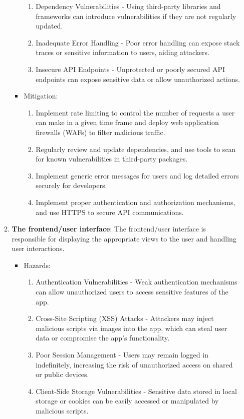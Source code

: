 \documentclass{article}
\begin{document}
\begin{enumerate}
\begin{enumerate}
\begin{itemize}
\begin{enumerate}
					\item Dependency Vulnerabilities - Using third-party libraries and frameworks can introduce vulnerabilities if they are not regularly updated.
					\item Inadequate Error Handling - Poor error handling can expose stack traces or sensitive information to users, aiding attackers.
					\item Insecure API Endpoints - Unprotected or poorly secured API endpoints can expose sensitive data or allow unauthorized actions.
				\end{enumerate}
			\item Mitigation:
				\begin{enumerate}
					\item Implement rate limiting to control the number of requests a user can make in a given time frame and deploy web application firewalls (WAFs) to filter malicious traffic. 
					\item Regularly review and update dependencies, and use tools to scan for known vulnerabilities in third-party packages.
					\item Implement generic error messages for users and log detailed errors securely for developers.
					\item Implement proper authentication and authorization mechanisms, and use HTTPS to secure API communications.
				\end{enumerate}
		\end{itemize}
        \item \textbf{The frontend/user interface}: The frontend/user interface
        is responsible for displaying the appropriate views to the user and
        handling user interactions.
		\begin{itemize}
			\item Hazards:
				\begin{enumerate}
					\item Authentication Vulnerabilities - Weak authentication mechanisms can allow unauthorized users to access sensitive features of the app.
					\item Cross-Site Scripting (XSS) Attacks - Attackers may inject malicious scripts via images into the app, which can steal user data or compromise the app's functionality.
					\item Poor Session Management - Users may remain logged in indefinitely, increasing the risk of unauthorized access on shared or public devices.
					\item Client-Side Storage Vulnerabilities - Sensitive data stored in local storage or cookies can be easily accessed or manipulated by malicious scripts.

\end{enumerate}
\end{itemize}
\end{enumerate}
\end{enumerate}
\end{document}
